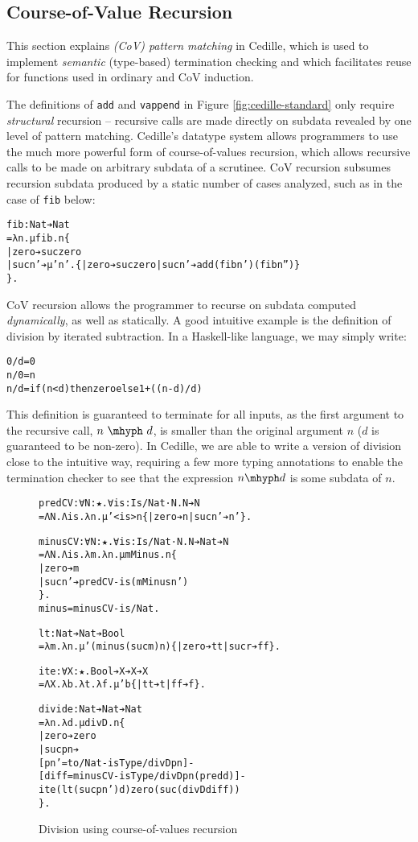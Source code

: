 \documentclass{article}
\begin{document}
\subsection{Course-of-Value Recursion}
\label{sec:intro-cov}

This section explains \textit{(CoV) pattern matching} in Cedille, which is used
to implement \textit{semantic} (type-based) termination checking and which
facilitates reuse for functions used in ordinary and CoV induction.

The definitions of \texttt{add} and \texttt{vappend} in Figure
\ref{fig:cedille-standard} only require \textit{structural} recursion --
recursive calls are made directly on subdata revealed by one level of pattern
matching. Cedille's datatype system allows programmers to use the much more
powerful form of course-of-values recursion, which allows recursive calls to be
made on arbitrary subdata of a scrutinee. CoV recursion subsumes recursion
subdata produced by a static number of cases analyzed, such as in the case of
\texttt{fib} below:
{
\begin{alltt}
fib: Nat ➔ Nat
= λ n. μ fib. n \{
  | zero ➔ suc zero
  | suc n' ➔ μ' n'. \{| zero ➔ suc zero | suc n' ➔ add (fib n') (fib n'')\}
 \}.
\end{alltt}
}
CoV recursion allows the programmer to recurse on subdata computed
\textit{dynamically}, as well as statically. A good intuitive example is the
definition of division by iterated subtraction. In a Haskell-like language, we
may simply write:
{
\begin{alltt}
0 / d = 0
n / 0 = n
n / d = if (n < d) then zero else 1 + ((n - d) / d)
\end{alltt}
}
This definition is guaranteed to terminate for all inputs, as the first argument
to the recursive call, $n\ \mhyph\ d$, is smaller than the original argument $n$
($d$ is guaranteed to be non-zero). In Cedille, we are able to write a version
of division close to the intuitive way, requiring a few more typing annotations
to enable the termination checker to see that the expression \(n \mhyph d\) is
some subdata of $n$.

\begin{figure}[h!]
\begin{alltt}
predCV: ∀ N: ★. ∀ is: Is/Nat ·N. N ➔ N
= Λ N. Λ is. λ n. μ'<is> n \{| zero ➔ n | suc n' ➔ n'\}.

minusCV: ∀ N: ★. ∀ is: Is/Nat ·N. N ➔ Nat ➔ N
= Λ N. Λ is. λ m. λ n. μ mMinus. n \{
  | zero ➔ m
  | suc n' ➔ predCV -is (mMinus n')
  \}.
minus = minusCV -is/Nat.

lt: Nat ➔ Nat ➔ Bool
= λ m. λ n. μ' (minus (suc m) n) \{| zero ➔ tt | suc r ➔ ff \}.

ite: ∀ X: ★. Bool ➔ X ➔ X ➔ X
= Λ X. λ b. λ t. λ f. μ' b \{| tt ➔ t | ff ➔ f\}.

divide: Nat ➔ Nat ➔ Nat
= λ n. λ d. μ divD. n \{
  | zero ➔ zero
  | suc pn ➔
    [pn' = to/Nat -isType/divD pn] -
    [diff = minusCV -isType/divD pn (pred d)] -
      ite (lt (suc pn') d) zero (suc (divD diff))
  \}.
\end{alltt}
  \caption{Division using course-of-values recursion}
  \label{fig:cov-divide}
\end{figure}
\end{document}
